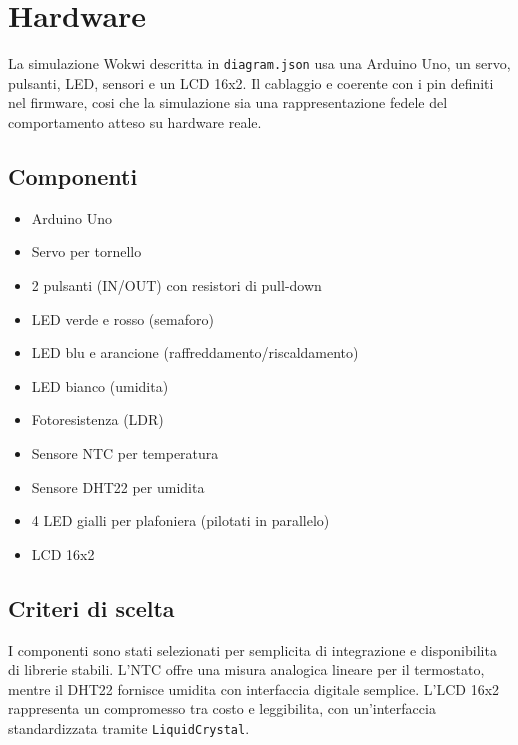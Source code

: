 \chapter{Hardware}

La simulazione Wokwi descritta in \texttt{diagram.json} usa una Arduino Uno, un servo, pulsanti, LED, sensori e un LCD 16x2. Il cablaggio e coerente con i pin definiti nel firmware, cosi che la simulazione sia una rappresentazione fedele del comportamento atteso su hardware reale.

\section{Componenti}
\begin{itemize}
  \item Arduino Uno
  \item Servo per tornello
  \item 2 pulsanti (IN/OUT) con resistori di pull-down
  \item LED verde e rosso (semaforo)
  \item LED blu e arancione (raffreddamento/riscaldamento)
  \item LED bianco (umidita)
  \item Fotoresistenza (LDR)
  \item Sensore NTC per temperatura
  \item Sensore DHT22 per umidita
  \item 4 LED gialli per plafoniera (pilotati in parallelo)
  \item LCD 16x2
\end{itemize}

\section{Criteri di scelta}
I componenti sono stati selezionati per semplicita di integrazione e disponibilita di librerie stabili. L'NTC offre una misura analogica lineare per il termostato, mentre il DHT22 fornisce umidita con interfaccia digitale semplice. L'LCD 16x2 rappresenta un compromesso tra costo e leggibilita, con un'interfaccia standardizzata tramite \texttt{LiquidCrystal}.

